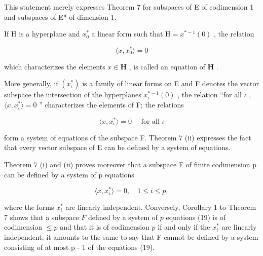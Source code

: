 This statement merely expresses Theorem 7 for subspaces of E of codimension 1 and subspaces of E* of dimension 1.

If H is a hyperplane and \(x_{0}^{*}\) a linear form such that \(\mathrm{H}=x^{*-1}(0)\) , the relation

\[
\langle x, x _ {0} ^ {*} \rangle = 0
\]

which characterizes the elements \(x \in \mathbf{H}\) , is called an equation of \(\mathbf{H}\) .

More generally, if \((x_{\iota}^{*})\) is a family of linear forms on E and F denotes the vector subspace the intersection of the hyperplanes \(x_{\iota}^{*-1}(0)\) , the relation ``for all \(\iota\) , \(\langle x, x_{\iota}^{*}\rangle = 0\) '' characterizes the elements of F; the relations

\[
\langle x, x _ {\iota} ^ {*} \rangle = 0 \quad \text { for   all } \iota
\]

form a system of equations of the subspace F. Theorem 7 (ii) expresses the fact that every vector subspace of E can be defined by a system of equations.

Theorem 7 (i) and (ii) proves moreover that a subspace F of finite codimension p can be defined by a system of p equations

\[
\langle x, x _ {i} ^ {*} \rangle = 0, \quad 1 \leqslant i \leqslant p,\tag{19}
\]

where the forms \(x_{i}^{*}\) are linearly independent. Conversely, Corollary 1 to Theorem 7 shows that a subspace \(F\) defined by a system of \(p\) equations (19) is of codimension \(\leqslant p\) and that it is of codimension \(p\) if and only if the \(x_{i}^{*}\) are linearly independent; it amounts to the same to say that F cannot be defined by a system consisting of at most p - 1 of the equations (19).

